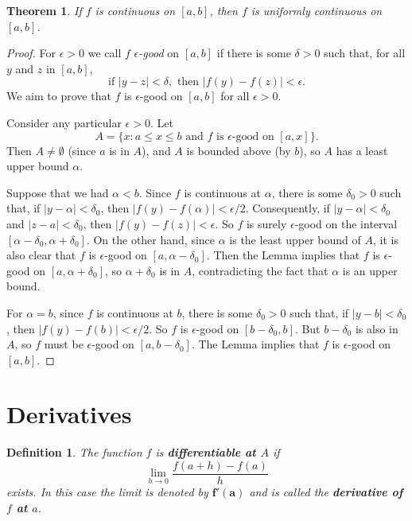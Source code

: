 \documentclass{article}
\numberwithin{corollary}{subsection}
\numberwithin{definition}{subsection}
\newtheorem*{definition*}{Definition}
\numberwithin{lemma}{subsection}
\newtheorem{theorem}{Theorem}
\numberwithin{theorem}{subsection}
\begin{document}
\begin{theorem}
  If $f$ is continuous on $[a, b]$, then $f$ is uniformly continuous on $[a,
  b]$.
\end{theorem}
\begin{proof}
  For $\epsilon > 0$ we call $f$ \emph{$\epsilon$-good} on $[a, b]$ if there is
  some $\delta > 0$ such that, for all $y$ and $z$ in $[a, b]$, \[
    \text{if } |y - z| < \delta, \text{ then } |f(y) - f(z)| < \epsilon.
  \] We aim to prove that $f$ is $\epsilon$-good on $[a, b]$ for all $\epsilon
  > 0$.

  Consider any particular $\epsilon > 0$. Let \[
    A = \{x: a \leq x \leq b \text{ and } f \text{ is }
    \epsilon\text{-good on } [a, x]\}.
  \] Then $A \neq \emptyset$ (since $a$ is in $A$), and $A$ is bounded above
  (by $b$), so $A$ has a least upper bound $\alpha$.

  Suppose that we had $\alpha < b$. Since $f$ is continuous at $\alpha$, there
  is some $\delta_0 > 0$ such that, if $|y - \alpha| < \delta_0$, then $|f(y) -
  f(\alpha)| < \epsilon/2$. Consequently, if $|y - \alpha| < \delta_0$ and $|z
  - a| < \delta_0$, then $|f(y) - f(z)| < \epsilon$. So $f$ is surely
  $\epsilon$-good on the interval $[\alpha - \delta_0, \alpha + \delta_0]$. On
  the other hand, since $\alpha$ is the least upper bound of $A$, it is also
  clear that $f$ is $\epsilon$-good on $[a, \alpha - \delta_0]$. Then the Lemma
  implies that $f$ is $\epsilon$-good on $[a, \alpha + \delta_0]$, so $\alpha +
  \delta_0$ is in $A$, contradicting the fact that $\alpha$ is an upper bound.

  For $\alpha = b$, since $f$ is continuous at $b$, there is some $\delta_0 >
  0$ such that, if $|y - b| < \delta_0$, then $|f(y) - f(b)| < \epsilon/2$. So
  $f$ is $\epsilon$-good on $[b - \delta_0, b]$. But $b - \delta_0$ is also in
  $A$, so $f$ must be $\epsilon$-good on $[a, b - \delta_0]$. The Lemma implies
  that $f$ is $\epsilon$-good on $[a, b]$.
\end{proof}

\section{Derivatives}

\begin{definition*}
  The function $f$ is \textbf{differentiable at $A$} if \[
    \lim_{h \to 0}\frac{f(a + h) - f(a)}{h}
  \] exists. In this case the limit is denoted by $\mathbf{f'(a)}$ and is
  called the \textbf{derivative of $f$ at $a$}.
\end{definition*}
\end{document}
